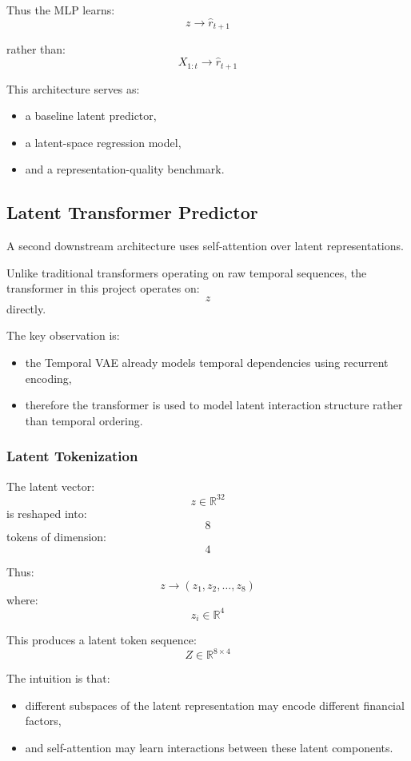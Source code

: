 \documentclass[11pt]{article}
\begin{document}
Thus the MLP learns:
\[
z
\rightarrow
\hat r_{t+1}
\]

rather than:
\[
X_{1:t}
\rightarrow
\hat r_{t+1}
\]

This architecture serves as:
\begin{itemize}
    \item a baseline latent predictor,
    \item a latent-space regression model,
    \item and a representation-quality benchmark.
\end{itemize}

\subsection{Latent Transformer Predictor}

A second downstream architecture uses self-attention over latent representations.

Unlike traditional transformers operating on raw temporal sequences, the transformer in this project operates on:
\[
z
\]
directly.

The key observation is:
\begin{itemize}
    \item the Temporal VAE already models temporal dependencies using recurrent encoding,
    \item therefore the transformer is used to model latent interaction structure rather than temporal ordering.
\end{itemize}

\subsubsection{Latent Tokenization}

The latent vector:
\[
z
\in
\mathbb{R}^{32}
\]
is reshaped into:
\[
8
\]
tokens of dimension:
\[
4
\]

Thus:
\[
z
\rightarrow
(z_1,z_2,\dots,z_8)
\]
where:
\[
z_i
\in
\mathbb{R}^4
\]

This produces a latent token sequence:
\[
Z
\in
\mathbb{R}^{8\times4}
\]

The intuition is that:
\begin{itemize}
    \item different subspaces of the latent representation may encode different financial factors,
    \item and self-attention may learn interactions between these latent components.
\end{itemize}
\end{document}
